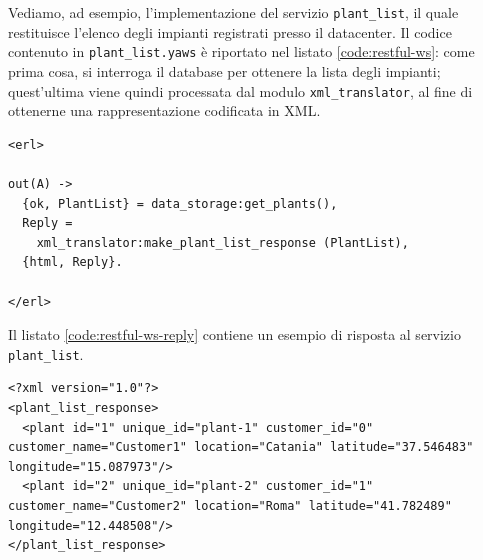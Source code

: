 %
Vediamo, ad esempio, l'implementazione del servizio \texttt{plant\_list}, il quale restituisce 
l'elenco degli impianti registrati presso il datacenter.
%
Il codice contenuto in \texttt{plant\_list.yaws} \`e riportato nel listato \ref{code:restful-ws}:
come prima cosa, si interroga il database per ottenere la lista degli impianti; quest'ultima viene 
quindi processata dal modulo \texttt{xml\_translator}, al fine di ottenerne una rappresentazione
codificata in XML.
%
\begin{lstlisting}[caption={Servizio \texttt{plant\_list}}, label={code:restful-ws},frame=trBL]
<erl>

out(A) ->
  {ok, PlantList} = data_storage:get_plants(),
  Reply = 
    xml_translator:make_plant_list_response (PlantList),
  {html, Reply}.

</erl>
\end{lstlisting}
%

Il listato \ref{code:restful-ws-reply} contiene un esempio di risposta al servizio \texttt{plant\_list}.
%
\begin{lstlisting}[caption={Risposta al servizio \texttt{plant\_list}}, label={code:restful-ws-reply},frame=trBL]
<?xml version="1.0"?>
<plant_list_response>
  <plant id="1" unique_id="plant-1" customer_id="0" customer_name="Customer1" location="Catania" latitude="37.546483" longitude="15.087973"/>
  <plant id="2" unique_id="plant-2" customer_id="1" customer_name="Customer2" location="Roma" latitude="41.782489" longitude="12.448508"/>
</plant_list_response>
\end{lstlisting}


